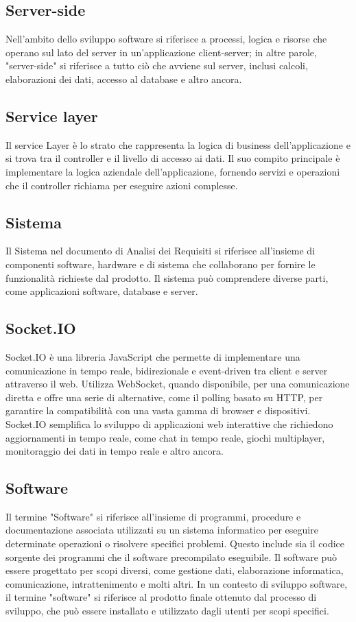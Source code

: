 \subsection*{Server-side} 
Nell'ambito dello sviluppo software si riferisce a processi, logica e risorse che operano sul lato del server in un'applicazione client-server; in altre parole, "server-side" si riferisce a tutto ciò che avviene sul server, inclusi calcoli, elaborazioni dei dati, accesso al database e altro ancora.
\subsection*{Service layer} 
Il service Layer è lo strato che rappresenta la logica di business dell'applicazione e si trova tra il controller e il livello di accesso ai dati. Il suo compito principale è implementare la logica aziendale dell'applicazione, fornendo servizi e operazioni che il controller richiama per eseguire azioni complesse.
\subsection*{Sistema} 
Il Sistema nel documento di Analisi dei Requisiti si riferisce all'insieme di componenti software, hardware e di sistema che collaborano per fornire le funzionalità richieste dal prodotto. Il sistema può comprendere diverse parti, come applicazioni software, database e server.
\subsection*{Socket.IO} 
Socket.IO è una libreria JavaScript che permette di implementare una comunicazione in tempo reale, bidirezionale e event-driven tra client e server attraverso il web. Utilizza WebSocket, quando disponibile, per una comunicazione diretta e offre una serie di alternative, come il polling basato su HTTP, per garantire la compatibilità con una vasta gamma di browser e dispositivi. Socket.IO semplifica lo sviluppo di applicazioni web interattive che richiedono aggiornamenti in tempo reale, come chat in tempo reale, giochi multiplayer, monitoraggio dei dati in tempo reale e altro ancora.
\subsection*{Software} 
Il termine "Software" si riferisce all'insieme di programmi, procedure e documentazione associata utilizzati su un sistema informatico per eseguire determinate operazioni o risolvere specifici problemi. Questo include sia il codice sorgente dei programmi che il software precompilato eseguibile. Il software può essere progettato per scopi diversi, come gestione dati, elaborazione informatica, comunicazione, intrattenimento e molti altri. In un contesto di sviluppo software, il termine "software" si riferisce al prodotto finale ottenuto dal processo di sviluppo, che può essere installato e utilizzato dagli utenti per scopi specifici. 

